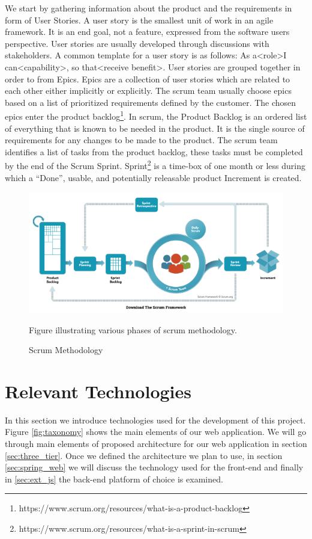 We start by gathering information about the product and the requirements in form of User Stories.
A user story is the smallest unit of work in an agile framework. It is an end goal, not a feature, expressed from the software users perspective. User stories are usually developed through discussions with stakeholders.
A common template for a user story is as follows:
As a\textless role\textgreater I can\textless capability\textgreater, so that\textless receive benefit\textgreater.
User stories are grouped together in order to from Epics. Epics are a collection of user stories which are related to each other either implicitly or explicitly.
The scrum team usually choose epics based on a list of prioritized requirements defined by the customer. The chosen epics enter the product backlog\footnote{https://www.scrum.org/resources/what-is-a-product-backlog}.
In scrum, the Product Backlog is an ordered list of everything that is known to be needed in the product. It is the single source of requirements for any changes to be made to the product.
The scrum team identifies a list of tasks from the product backlog, these tasks must be completed by the end of the Scrum Sprint.
Sprint\footnote{https://www.scrum.org/resources/what-is-a-sprint-in-scrum} is a time-box of one month or less during which a “Done”, usable, and potentially releasable product Increment is created. 

\begin{figure} 
\centering
\includegraphics[width=14cm]{pictures/Scrum_Framework.png}
\caption{Scrum Methodology}
Figure illustrating various phases of scrum methodology. 
\label{fig:scrum_pic}
\end{figure}


\section{Relevant Technologies} \label{sec:relevant_technologies}
In this section we introduce technologies used for the development of this project. Figure \ref{fig:taxonomy} shows the main elements of our web application. We will go through main elements of proposed architecture for our web application in section \ref{sec:three_tier}. Once we defined the architecture we plan to use, in section \ref{sec:spring_web} we will discuss the technology used for the front-end and finally in \ref{sec:ext_js} the back-end platform of choice is examined.



